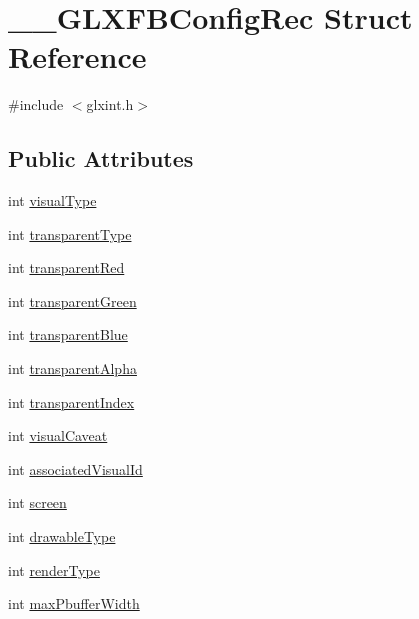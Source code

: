 \hypertarget{struct_____g_l_x_f_b_config_rec}{}\section{\+\_\+\+\_\+\+G\+L\+X\+F\+B\+Config\+Rec Struct Reference}
\label{struct_____g_l_x_f_b_config_rec}


{\ttfamily \#include $<$glxint.\+h$>$}

\subsection*{Public Attributes}
\begin{DoxyCompactItemize}
\item 
int \hyperlink{struct_____g_l_x_f_b_config_rec_a4d92bdd91ddeae6daa3e35f33cf1ec07}{visual\+Type}
\item 
int \hyperlink{struct_____g_l_x_f_b_config_rec_aed6ddf7ec021be53900803fcf259bbe5}{transparent\+Type}
\item 
int \hyperlink{struct_____g_l_x_f_b_config_rec_a68f2b16385c2d4f7e4667e498fb38900}{transparent\+Red}
\item 
int \hyperlink{struct_____g_l_x_f_b_config_rec_aec79ad2b0c17e8964280dfca38adc31e}{transparent\+Green}
\item 
int \hyperlink{struct_____g_l_x_f_b_config_rec_a76ab9b193a59b16dad0d9bd97a5e6bbd}{transparent\+Blue}
\item 
int \hyperlink{struct_____g_l_x_f_b_config_rec_a94fec2f0e73c40e32de52cc9a515deb0}{transparent\+Alpha}
\item 
int \hyperlink{struct_____g_l_x_f_b_config_rec_aef4a9dcdd3ed8e6aba2125d0b6dad280}{transparent\+Index}
\item 
int \hyperlink{struct_____g_l_x_f_b_config_rec_a1563dc0cdd8d896924ae7fa1ba2b1641}{visual\+Caveat}
\item 
int \hyperlink{struct_____g_l_x_f_b_config_rec_ad153e25fb95aef9c376da82c29d1e85f}{associated\+Visual\+Id}
\item 
int \hyperlink{struct_____g_l_x_f_b_config_rec_a6c67117d7fa1687f615c3a5c28edd51c}{screen}
\item 
int \hyperlink{struct_____g_l_x_f_b_config_rec_acf17fc080adb50477710fea774bab2c7}{drawable\+Type}
\item 
int \hyperlink{struct_____g_l_x_f_b_config_rec_ae877166fdca313f5cb8d187d3bbf000f}{render\+Type}
\item 
int \hyperlink{struct_____g_l_x_f_b_config_rec_a00cc94bfa87c1ce105f9f6a6455e98dd}{max\+Pbuffer\+Width}

\end{DoxyCompactItemize}
